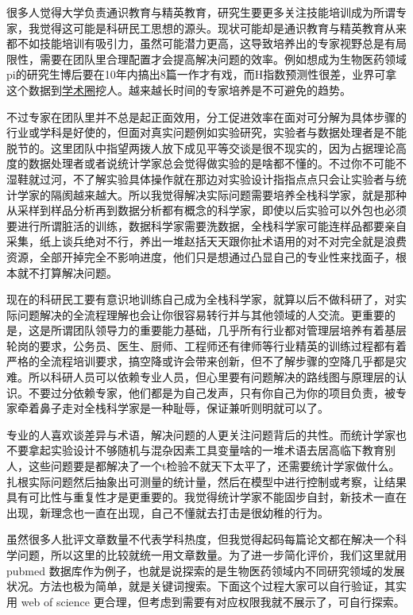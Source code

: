 \documentclass[]{tufte-book}
\begin{document}
很多人觉得大学负责通识教育与精英教育，研究生要更多关注技能培训成为所谓专家，我觉得这可能是科研民工思想的源头。现状可能却是通识教育与精英教育从来都不如技能培训有吸引力，虽然可能潜力更高，这导致培养出的专家视野总是有局限性，需要在团队里合理配置才会提高解决问题的效率。例如想成为生物医药领域pi的研究生博后要在10年内搞出8篇一作才有戏，而H指数预测性很差，业界可拿这个数据到\href{https://peerj.com/articles/1262/}{学术圈}挖人。越来越长时间的专家培养是不可避免的趋势。

不过专家在团队里并不总是起正面效用，分工促进效率在面对可分解为具体步骤的行业或学科是好使的，但面对真实问题例如实验研究，实验者与数据处理者是不能脱节的。这里团队中指望两拨人放下成见平等交谈是很不现实的，因为占据理论高度的数据处理者或者说统计学家总会觉得做实验的是啥都不懂的。不过你不可能不湿鞋就过河，不了解实验具体操作就在那边对实验设计指指点点只会让实验者与统计学家的隔阂越来越大。所以我觉得解决实际问题需要培养全栈科学家，就是那种从采样到样品分析再到数据分析都有概念的科学家，即使以后实验可以外包也必须要进行所谓脏活的训练，数据科学家需要洗数据，全栈科学家可能连样品都要亲自采集，纸上谈兵绝对不行，养出一堆赵括天天跟你扯术语用的对不对完全就是浪费资源，全部开掉完全不影响进度，他们只是想通过凸显自己的专业性来找面子，根本就不打算解决问题。

现在的科研民工要有意识地训练自己成为全栈科学家，就算以后不做科研了，对实际问题解决的全流程理解也会让你很容易转行并与其他领域的人交流。更重要的是，这是所谓团队领导力的重要能力基础，几乎所有行业都对管理层培养有着基层轮岗的要求，公务员、医生、厨师、工程师还有律师等行业精英的训练过程都有着严格的全流程培训要求，搞空降或许会带来创新，但不了解步骤的空降几乎都是灾难。所以科研人员可以依赖专业人员，但心里要有问题解决的路线图与原理层的认识。不要过分依赖专家，他们都是为自己发声，只有你自己为你的项目负责，被专家牵着鼻子走对全栈科学家是一种耻辱，保证兼听则明就可以了。

专业的人喜欢谈差异与术语，解决问题的人更关注问题背后的共性。而统计学家也不要拿起实验设计不够随机与混杂因素工具变量啥的一堆术语去居高临下教育别人，这些问题要是都解决了一个t检验不就天下太平了，还需要统计学家做什么。扎根实际问题然后抽象出可测量的统计量，然后在模型中进行控制或考察，让结果具有可比性与重复性才是更重要的。我觉得统计学家不能固步自封，新技术一直在出现，新理念也一直在出现，自己不懂就去打击是很幼稚的行为。

虽然很多人批评文章数量不代表学科热度，但我觉得起码每篇论文都在解决一个科学问题，所以这里的比较就统一用文章数量。为了进一步简化评价，我们这里就用 pubmed 数据库作为例子，也就是说探索的是生物医药领域内不同研究领域的发展状况。方法也极为简单，就是关键词搜索。下面这个过程大家可以自行验证，其实用 web of science 更合理，但考虑到需要有对应权限我就不展示了，可自行探索。
\end{document}

